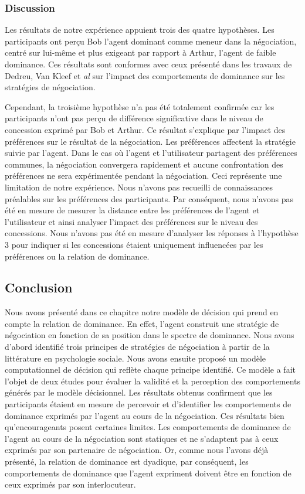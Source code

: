 {				\subsubsection{Discussion}
				
				Les résultats de notre expérience appuient trois des quatre hypothèses. Les participants ont perçu Bob l'agent dominant comme meneur dans la négociation, centré sur lui-même et plus exigeant par rapport à Arthur, l'agent de faible dominance. Ces résultats sont conformes avec ceux présenté dans les travaux de Dedreu, Van Kleef et \emph{al} \cite {de1995impact, de2004influence, de2004influence} sur l'impact des comportements de dominance sur les stratégies de négociation.
				
				Cependant, la troisième hypothèse n'a pas été totalement confirmée car les participants n'ont pas perçu de différence significative dans le niveau de concession exprimé par Bob et Arthur. Ce résultat s'explique par l'impact des préférences sur le résultat de la négociation. Les préférences affectent la stratégie suivie par l'agent. Dans le cas où l'agent et l'utilisateur partagent des préférences communes, la négociation convergera rapidement et aucune confrontation des préférences ne sera expérimentée pendant la négociation. Ceci représente une limitation de notre expérience. Nous n'avons pas recueilli de connaissances préalables sur les préférences des participants. Par conséquent, nous n'avons pas été en mesure de mesurer la distance entre les préférences de l'agent et l'utilisateur et ainsi analyser l'impact des préférences sur le niveau des concessions.
				Nous n'avons pas été en mesure d'analyser les réponses à l'hypothèse 3 pour indiquer si les concessions étaient uniquement influencées par les préférences ou la relation de dominance. 
			
		\subsection{Conclusion}
			Nous avons présenté dans ce chapitre notre modèle de décision qui prend en compte la relation de dominance. En effet, l'agent construit une stratégie de négociation en fonction de sa position dans le spectre de dominance. Nous avons d'abord identifié trois principes de stratégies de négociation à partir de la littérature en psychologie sociale. Nous avons ensuite proposé un modèle computationnel de décision qui reflète chaque principe identifié.
			Ce modèle a fait l'objet de deux études pour évaluer la validité et la perception des comportements générés par le modèle décisionnel. Les résultats obtenus confirment que les participants étaient en mesure de percevoir et d'identifier les comportements de dominance exprimés par l'agent au cours de la négociation. Ces résultats bien qu'encourageants posent certaines limites. Les comportements de dominance de l'agent au cours de la négociation sont statiques et ne s'adaptent pas à ceux exprimés par son partenaire de négociation. Or, comme nous l'avons déjà présenté, la relation de dominance est dyadique, par conséquent, les comportements de dominance que l'agent expriment doivent être en fonction de ceux  exprimés par son interlocuteur.
			
}
